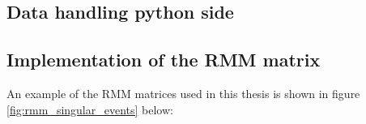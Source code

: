 \subsection*{Data handling python side}



\subsection*{Implementation of the RMM matrix}
An example of the RMM matrices used in this thesis is shown in figure \ref{fig:rmm_singular_events} below:


